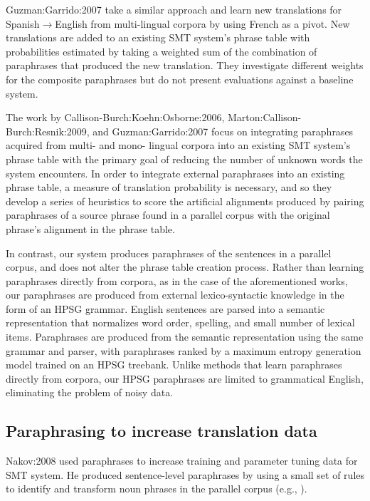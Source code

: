 \documentclass[english]{jnlp_1.4}
\newcommand{\para}[2]{}
\newcommand{\citet}{}
\begin{document}
\citet{Guzman:Garrido:2007} take a similar approach and learn new
translations for Spanish$\rightarrow$English from multi-lingual
corpora by using French as a pivot. New translations are added to an
existing SMT system's phrase table with probabilities estimated by
taking a weighted sum of the combination of paraphrases that produced
the new translation. They investigate different weights for the
composite paraphrases but do not present evaluations against a
baseline system.


The work by \citet{Callison-Burch:Koehn:Osborne:2006},
\citet{Marton:Callison-Burch:Resnik:2009}, and
\citet{Guzman:Garrido:2007} focus on integrating paraphrases acquired
from multi- and mono- lingual corpora into an existing SMT system's
phrase table with the primary goal of reducing the number of unknown
words the system encounters. In order to integrate external
paraphrases into an existing phrase table, a measure of translation
probability is necessary, and so they develop a series of heuristics
to score the artificial alignments produced by pairing paraphrases of
a source phrase found in a parallel corpus with the original phrase's
alignment in the phrase table.

In contrast, our system produces paraphrases of the sentences in a
parallel corpus, and does not alter the phrase table creation
process. Rather than learning paraphrases directly from corpora, as in
the case of the aforementioned works, our paraphrases are produced
from external lexico-syntactic knowledge in the form of an HPSG
grammar. English sentences are parsed into a semantic representation
that normalizes word order, spelling, and small number of lexical
items. Paraphrases are produced from the semantic representation using
the same grammar and parser, with paraphrases ranked by a maximum
entropy generation model trained on an HPSG treebank. Unlike methods
that learn paraphrases directly from corpora, our HPSG paraphrases are
limited to grammatical English, eliminating the problem of noisy data.


\subsection{Paraphrasing to increase translation data}


\citet{Nakov:2008} used paraphrases to increase training and parameter
tuning data for SMT system. He produced sentence-level paraphrases by
using a small set of rules to identify and transform noun phrases in
the parallel corpus (e.g., \para{$NP_1$ of $NP_2$}{$NP_2$ 's $NP_1$}).
\end{document}

